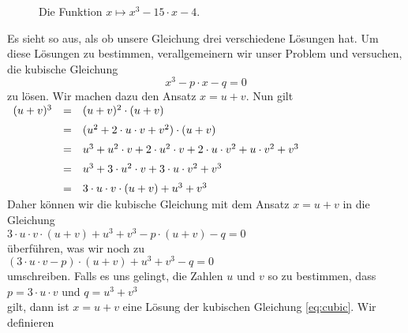 \begin{figure}[!ht]
  \centering
  \caption{Die Funktion $x \mapsto x^3 - 15 \cdot x - 4$.}
  \label{fig:cubic.eps}
\end{figure}

Es sieht so aus, als ob unsere Gleichung drei verschiedene L\"{o}sungen hat.  Um diese L\"{o}sungen zu bestimmen,
verallgemeinern wir unser Problem und versuchen, die kubische Gleichung
\begin{equation}
  \label{eq:cubic}
  x^3 - p \cdot x - q = 0  
\end{equation}
zu l\"{o}sen.  Wir machen dazu den Ansatz $x = u + v$.  Nun gilt
\\[0.2cm]
\hspace*{1.3cm}
$
\begin{array}[t]{lcl}
(u + v)^3 & = & (u + v)^2 \cdot (u + v)                                                           \\[0.2cm]
          & = & (u^2 + 2 \cdot u \cdot v + v^2) \cdot (u + v)                                     \\[0.2cm]
          & = & u^3 + u^2 \cdot v + 2 \cdot u^2 \cdot v + 2 \cdot u \cdot v^2 + u \cdot v^2 + v^3 \\[0.2cm]
          & = & u^3 + 3 \cdot u^2 \cdot v + 3 \cdot u \cdot v^2 + v^3                             \\[0.2cm]
          & = & 3 \cdot u \cdot v \cdot (u + v) + u^3 + v^3 
\end{array}
$
\\[0.2cm]
Daher k\"{o}nnen wir die kubische Gleichung mit dem Ansatz $x = u + v$ in die Gleichung
\\[0.2cm]
\hspace*{1.3cm}
$3 \cdot u \cdot v \cdot (u + v) + u^3 + v^3 - p \cdot (u + v) - q = 0$
\\[0.2cm]
\"{u}berf\"{u}hren, was wir noch zu
\\[0.2cm]
\hspace*{1.3cm}
$(3 \cdot u \cdot v - p) \cdot (u + v) + u^3 + v^3 - q = 0$
\\[0.2cm]
umschreiben.  Falls es uns gelingt, die Zahlen $u$ und $v$ so zu bestimmen, dass
\\[0.2cm]
\hspace*{1.3cm}
$p = 3 \cdot u \cdot v$ \quad und \quad $q = u^3 + v^3$
\\[0.2cm]
gilt, dann ist $x = u + v$ eine L\"{o}sung der kubischen Gleichung \ref{eq:cubic}.  Wir definieren
\\[0.2cm]
